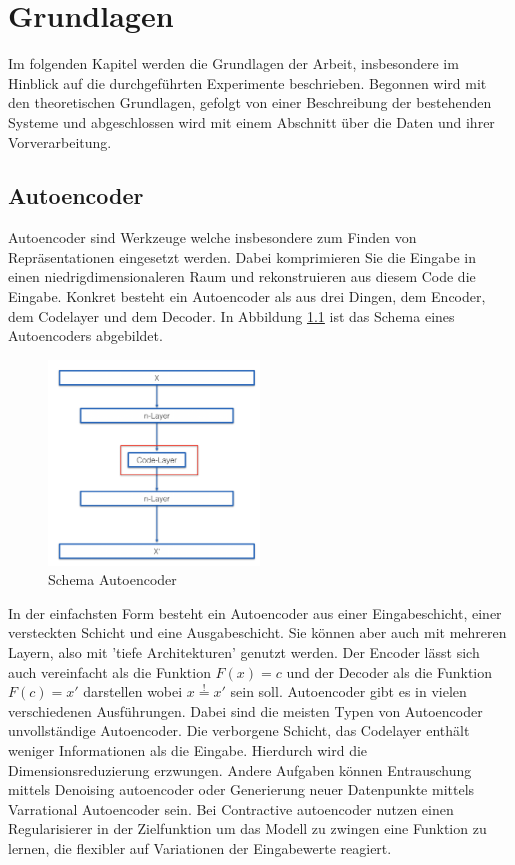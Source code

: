 \chapter{Grundlagen}
\label{chap:Grundlagen}
Im folgenden Kapitel werden die Grundlagen der Arbeit, insbesondere im Hinblick auf die durchgeführten Experimente beschrieben. Begonnen wird mit den theoretischen Grundlagen, gefolgt von einer Beschreibung der bestehenden Systeme und abgeschlossen wird mit einem Abschnitt über die Daten und ihrer Vorverarbeitung.

	\section{Autoencoder}
	\label{sec:ConvolutionalAutoencoder}		
	Autoencoder \cite{D.E.Rumelhart.1987} sind Werkzeuge welche insbesondere zum Finden von Repräsentationen eingesetzt werden. Dabei komprimieren Sie die Eingabe in einen niedrigdimensionaleren Raum und rekonstruieren aus diesem Code die Eingabe. Konkret besteht ein Autoencoder als aus drei Dingen, dem Encoder, dem Codelayer und dem Decoder. In Abbildung \ref{img:SchemaCAE} ist das Schema eines Autoencoders abgebildet.
			\begin{figure}[h]
			
				\centering
				\includegraphics[width=0.5\textwidth, center]{bilder/Schema_Autoencoders/Schema_CAE.png}
				\caption[Schema Autoencoder]{Schema Autoencoder}
				\label{img:SchemaCAE}
			\end{figure} 
	In der einfachsten Form besteht ein Autoencoder aus einer Eingabeschicht, einer versteckten Schicht und eine Ausgabeschicht. Sie können aber auch mit mehreren Layern, also mit 'tiefe Architekturen' genutzt werden. \cite{Hinton.2006} Der Encoder lässt sich auch vereinfacht als die Funktion $F(x)=c$ und der Decoder als die Funktion $ F(c)=x'$ darstellen wobei $x\stackrel{!}{=}x'$ sein soll. 
	Autoencoder gibt es in vielen verschiedenen Ausführungen. Dabei sind die meisten Typen von Autoencoder unvollständige Autoencoder. Die verborgene Schicht, das Codelayer enthält weniger Informationen als die Eingabe. Hierdurch wird die Dimensionsreduzierung erzwungen. Andere Aufgaben können Entrauschung mittels Denoising autoencoder \cite{Vincent.2008} oder Generierung neuer Datenpunkte mittels Varrational Autoencoder \cite{Kingma.2019} sein. Bei  Contractive autoencoder \cite{Rifai.201} nutzen einen Regularisierer in der Zielfunktion um das Modell zu zwingen eine Funktion zu lernen, die flexibler auf Variationen der Eingabewerte reagiert.   	

